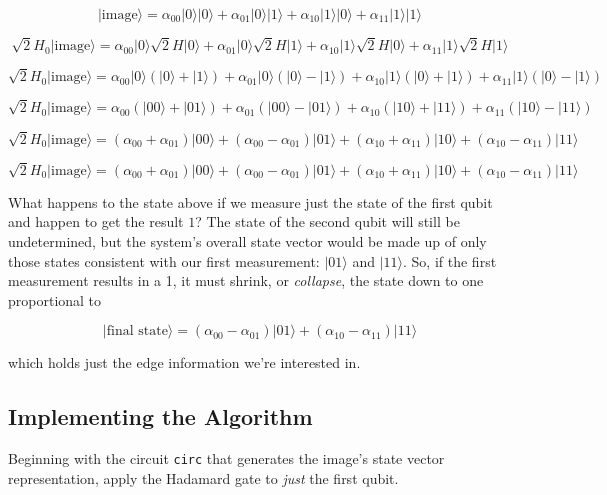\documentclass[11pt]{article}
\begin{document}
\[ |\textrm{image}\rangle = \alpha_{00}|0\rangle|0\rangle + \alpha_{01}|0\rangle|1\rangle + \alpha_{10}|1\rangle|0\rangle + \alpha_{11}|1\rangle|1\rangle \]

\[ \sqrt{2} H_0 |\textrm{image}\rangle = \alpha_{00}|0\rangle \sqrt{2} H |0\rangle + \alpha_{01}|0\rangle \sqrt{2} H|1\rangle + \alpha_{10}|1\rangle \sqrt{2} H|0\rangle + \alpha_{11}|1\rangle\sqrt{2} H|1\rangle\]

\[ \sqrt{2} H_0 |\textrm{image}\rangle = \alpha_{00}|0\rangle(|0\rangle + |1\rangle) + \alpha_{01}|0\rangle(|0\rangle - |1\rangle) + \alpha_{10}|1\rangle(|0\rangle + |1\rangle) + \alpha_{11}|1\rangle(|0\rangle - |1\rangle)\]

\[ \sqrt{2} H_0 |\textrm{image}\rangle = \alpha_{00}(|00\rangle+|01\rangle) + \alpha_{01}(|00\rangle-|01\rangle) + \alpha_{10}(|10\rangle+|11\rangle) + \alpha_{11}(|10\rangle-|11\rangle) \]

\[ \sqrt{2} H_0 |\textrm{image}\rangle = (\alpha_{00} + \alpha_{01})|00\rangle + (\alpha_{00} - \alpha_{01})|01\rangle + (\alpha_{10} + \alpha_{11})|10\rangle + (\alpha_{10} - \alpha_{11})|11\rangle \]

    \[ \sqrt{2} H_0 |\textrm{image}\rangle = (\alpha_{00} + \alpha_{01})|00\rangle + (\alpha_{00} - \alpha_{01})|01\rangle + (\alpha_{10} + \alpha_{11})|10\rangle + (\alpha_{10} - \alpha_{11})|11\rangle \]

What happens to the state above if we measure just the state of the
first qubit and happen to get the result \(1\)? The state of the second
qubit will still be undetermined, but the system's overall state vector
would be made up of only those states consistent with our first
measurement: \(|01\rangle\) and \(|11\rangle\). So, if the first
measurement results in a 1, it must shrink, or \emph{collapse}, the
state down to one proportional to

\[ |\textrm{final state}\rangle = (\alpha_{00} - \alpha_{01})|01\rangle + (\alpha_{10} - \alpha_{11})|11\rangle \]

which holds just the edge information we're interested in.

    \hypertarget{implementing-the-algorithm}{%
\subsection{Implementing the
Algorithm}\label{implementing-the-algorithm}}

Beginning with the circuit \texttt{circ} that generates the image's
state vector representation, apply the Hadamard gate to \emph{just} the
first qubit.
\end{document}
